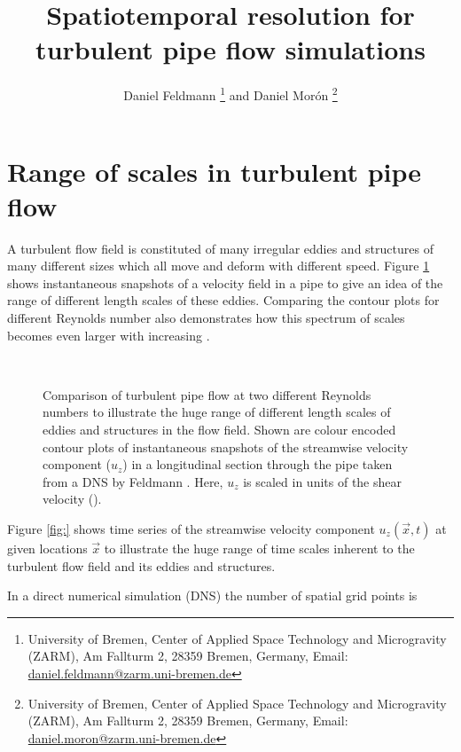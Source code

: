\documentclass[a4paper, 11pt, twoside, DIV=12]{scrartcl}
\title{Spatiotemporal resolution for\\ turbulent pipe flow simulations}
\subtitle{\vspace{-2.0ex}}
\author{Daniel Feldmann%
\thanks{University of Bremen,
Center of Applied Space Technology and Microgravity (ZARM),
Am Fallturm 2, 28359 Bremen, Germany,
Email: \url{daniel.feldmann@zarm.uni-bremen.de}}
and Daniel Mor\'on%
\thanks{University of Bremen,
Center of Applied Space Technology and Microgravity (ZARM),
Am Fallturm 2, 28359 Bremen, Germany,
Email: \url{daniel.moron@zarm.uni-bremen.de}}
}
\begin{document}
%
\maketitle
%
\section{Range of scales in turbulent pipe flow}
A turbulent flow field is constituted of many irregular eddies and structures of
many different sizes which all move and deform with different speed. Figure
\ref{fig:plotPipePhiCompare} shows instantaneous snapshots of a velocity field
in a pipe to give an idea of the range of different length scales of these
eddies. Comparing the contour plots for different Reynolds number also
demonstrates how this spectrum of scales becomes even larger with increasing
\Reynolds.
\begin{figure}[htb]
\centering
{}\\
\caption{Comparison of turbulent pipe flow at two different Reynolds numbers to
illustrate the huge range of different length scales of eddies and structures in
the flow field. Shown are colour encoded contour plots of instantaneous
snapshots of the streamwise velocity component ($u_z$) in a longitudinal section
through the pipe taken from a DNS by Feldmann \cite{Feldmann2015c}. Here, $u_z$
is scaled in units of the shear velocity (\utau).}
\label{fig:plotPipePhiCompare}
\end{figure}
Figure \ref{fig:} shows time series of the streamwise velocity component
$u_z(\vec{x},t)$ at given locations $\vec{x}$ to illustrate the huge range of
time scales inherent to the turbulent flow field and its eddies and structures.
\par
In a direct numerical simulation (DNS) the number of spatial grid points is
\end{document}
